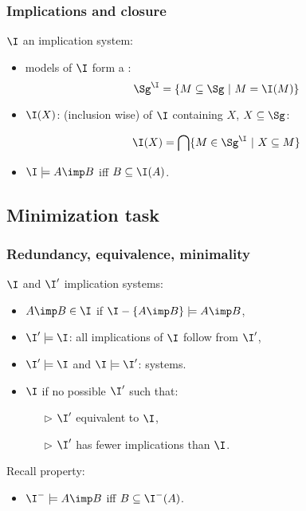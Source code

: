 \begin{frame}
\frametitle{Implications and closure}

$\I$ an implication system:
\begin{itemize}
\item models of $\I$ form a :
\[ \Sg^{\I} = \{ M \subseteq \Sg \ | \ M = \I(M) \} \]

\vspace{1.2em}

\item {} $\I(X)$:  (inclusion wise) of $\I$ containing $X$, $X \subseteq \Sg$: 

\[ \I(X) = \bigcap \{ M \in \Sg^{\I} \ | \ X \subseteq M \} \]

\item $\I \models A \imp B$ iff $B \subseteq \I(A)$.
\end{itemize}

\end{frame}



\subsection{Minimization task}

\begin{frame}
\frametitle{Redundancy, equivalence, minimality}

$\I$ and $\I'$ implication systems:
\begin{itemize}
	\item $A \imp B \in \I$  if $\I - \{A \imp B\} \models A \imp B$,
	\item $\I' \models \I$: all implications of $\I$ follow from $\I'$,
	\item $\I' \models \I$ and $\I \models \I'$:  systems.
	\item $\I$  if no possible $\I'$ such that:
		\begin{itemize}
			\item[\color{belize} $\triangleright$] $\I'$ equivalent to $\I$,
			\item[\color{belize} $\triangleright$] $\I'$ has fewer implications than $\I$.
		\end{itemize}
\end{itemize}

\vspace{0.8em}

\begin{lightreminder}
	Recall property: 
	\begin{itemize}
		\item $\I^{-} \models A \imp B$ iff $B \subseteq \I^{-}(A)$.
	\end{itemize}
\end{lightreminder}

\end{frame}

